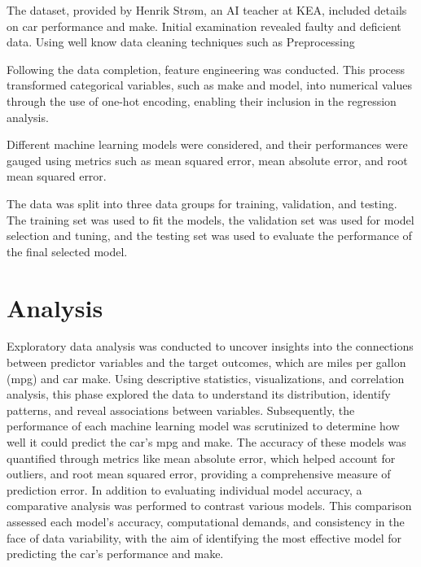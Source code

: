 \documentclass[a4paper, twocolumn]{article}
\begin{document}
The dataset, provided by Henrik Strøm, an AI teacher at KEA, included details on car performance and make. Initial examination revealed faulty and deficient data. Using well know data cleaning techniques such as Preprocessing \textcite{hellerstein2013quantitative}

Following the data completion, feature engineering was conducted. This process transformed categorical variables, such as make and model, into numerical values through the use of one-hot encoding, enabling their inclusion in the regression analysis.

Different machine learning models were considered, and their performances were gauged using metrics such as mean squared error, mean absolute error, and root mean squared error.

The data was split into three data groups for training, validation, and testing. The training set was used to fit the models, the validation set was used for model selection and tuning, and the testing set was used to evaluate the performance of the final selected model.


\section{Analysis\label{sec:Analysis}}

Exploratory data analysis was conducted to uncover insights into the connections between predictor variables and the target outcomes, which are miles per gallon (mpg) and car make. Using descriptive statistics, visualizations, and correlation analysis, this phase explored the data to understand its distribution, identify patterns, and reveal associations between variables. Subsequently, the performance of each machine learning model was scrutinized to determine how well it could predict the car's mpg and make. The accuracy of these models was quantified through metrics like mean absolute error, which helped account for outliers, and root mean squared error, providing a comprehensive measure of prediction error. In addition to evaluating individual model accuracy, a comparative analysis was performed to contrast various models. This comparison assessed each model's accuracy, computational demands, and consistency in the face of data variability, with the aim of identifying the most effective model for predicting the car's performance and make.
\end{document}
